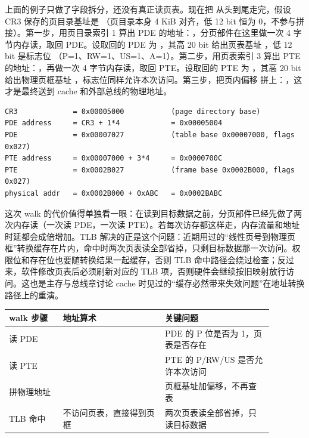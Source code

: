 上面的例子只做了字段拆分，还没有真正读页表。现在把  从头到尾走完，假设 CR3 保存的页目录基址是 （页目录本身 4 KiB 对齐，低 12 bit 恒为 0，不参与拼接）。第一步，用页目录索引 1 算出 PDE 的地址：，分页部件在这里做一次 4 字节内存读，取回 PDE。设取回的 PDE 为 ，其高 20 bit 给出页表基址 ，低 12 bit 是标志位 （P=1、RW=1、US=1、A=1）。第二步，用页表索引 3 算出 PTE 的地址：，再做一次 4 字节内存读，取回 PTE。设取回的 PTE 为 ，其高 20 bit 给出物理页框基址 ，标志位同样允许本次访问。第三步，把页内偏移  拼上：，这才是最终送到 cache 和外部总线的物理地址。

\begin{lstlisting}
CR3             = 0x00005000           (page directory base)
PDE address     = CR3 + 1*4            = 0x00005004
PDE             = 0x00007027           (table base 0x00007000, flags 0x027)
PTE address     = 0x00007000 + 3*4     = 0x0000700C
PTE             = 0x0002B027           (frame base 0x0002B000, flags 0x027)
physical addr   = 0x0002B000 + 0xABC   = 0x0002BABC
\end{lstlisting}

这次 walk 的代价值得单独看一眼：在读到目标数据之前，分页部件已经先做了两次内存读（一次读 PDE，一次读 PTE）。若每次访存都这样走，内存流量和地址时延都会成倍增加。TLB 解决的正是这个问题：近期用过的“线性页号到物理页框”转换缓存在片内，命中时两次页表读全部省掉，只剩目标数据那一次访问。权限位和存在位也要随转换结果一起缓存，否则 TLB 命中路径会绕过检查；反过来，软件修改页表后必须刷新对应的 TLB 项，否则硬件会继续按旧映射放行访问。这也是主存与总线章讨论 cache 时见过的“缓存必然带来失效问题”在地址转换路径上的重演。

\begin{longtable}{L{0.18\linewidth}L{0.34\linewidth}L{0.36\linewidth}}
\toprule
walk 步骤 & 地址算术 & 关键问题 \\
\midrule
读 PDE &  & PDE 的 P 位是否为 1，页表是否存在 \\
读 PTE &  & PTE 的 P/RW/US 是否允许本次访问 \\
拼物理地址 &  & 页框基址加偏移，不再查表 \\
TLB 命中 & 不访问页表，直接得到页框 & 两次页表读全部省掉，只读目标数据 \\
\bottomrule
\end{longtable}

